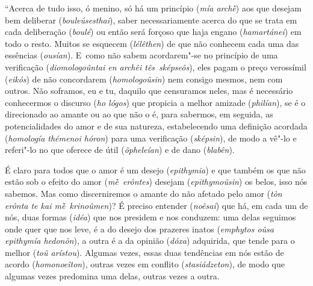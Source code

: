 ``Acerca de tudo isso, ó menino, só há um princípio (\emph{mía archḕ})
aos que desejam bem deliberar (\emph{bouleúsesthai}), \bekker{[237c]} saber
necessariamente acerca do que se trata em cada deliberação
(\emph{boulé}) ou então será forçoso que haja engano (\emph{hamartánei})
em todo o resto. Muitos se esquecem (\emph{lélêthen}) de que não
conhecem cada uma das essências (\emph{ousían}). E~como não sabem
acordarem"-se no princípio de uma verificação (\emph{diomologoûntai en
archêi tês}~\emph{sképseôs}), eles pagam o preço verossímil
(\emph{eikós}) de não concordarem (\emph{homologoûsin}) nem consigo
mesmos, nem com outros. Não soframos, eu e tu, daquilo que censuramos
neles, mas é necessário conhecermos o discurso (\emph{ho lógos}) que
propicia a melhor amizade (\emph{philían}), se é o direcionado ao amante
ou ao que não o é, para sabermos, em seguida, as potencialidades do amor
e de sua natureza, estabelecendo uma definição acordada (\emph{homología
thémenoi hóron}) \bekker{[237d]} para uma verificação (\emph{sképsin}), de
modo a vê"-lo e referi"-lo no que oferece de útil (\emph{ôpheleían}) e de
dano (\emph{blabên}).

É claro para todos que o amor é um desejo (\emph{epithymia}) e que
também os que não estão sob o efeito do amor (\emph{mḕ~erôntes}) desejam
(\emph{epithymoûsin}) os belos, isso nós sabemos. Mas como discerniremos
o amante do não afetado pelo amor (\emph{tòn erônta te kai
mḕ~krinoûmen})? É preciso entender (\emph{noêsai}) que há, em cada um de
nós, duas formas (\emph{idéa}) que nos presidem e nos conduzem: uma
delas seguimos onde quer que nos leve, é a do desejo dos prazeres inatos
(\emph{emphytos oûsa epithymía hedonôn}), a outra é a da opinião
(\emph{dóxa}) adquirida, que tende para o melhor (\emph{toû arístou}).
\bekker{[237e]} Algumas vezes, essas duas tendências em nós estão de acordo
(\emph{homonoeîton}), outras vezes em conflito (\emph{stasiádzeton}), de
modo que algumas vezes predomina uma delas, outras vezes a outra.

